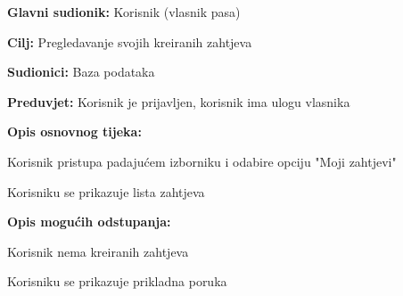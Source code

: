 					\noindent {}
					\begin{packed_item}
						
						\item \textbf{Glavni sudionik: } Korisnik (vlasnik pasa)
						\item  \textbf{Cilj:} Pregledavanje svojih kreiranih zahtjeva
						\item  \textbf{Sudionici:} Baza podataka 
						\item  \textbf{Preduvjet:} Korisnik je prijavljen, korisnik ima ulogu vlasnika
						\item  \textbf{Opis osnovnog tijeka:}
						
						\item[] \begin{packed_enum}
							
							\item Korisnik pristupa padajućem izborniku i odabire opciju "Moji zahtjevi"  
							\item Korisniku se prikazuje lista zahtjeva
							
						\end{packed_enum}
					
						\item  \textbf{Opis mogućih odstupanja:}
						
						\item[] \begin{packed_item}
							
							\item[2.a] Korisnik nema kreiranih zahtjeva
							\item[] \begin{packed_enum}
								
								\item Korisniku se prikazuje prikladna poruka
								
							\end{packed_enum}
						\end{packed_item}
					\end{packed_item}	
				
